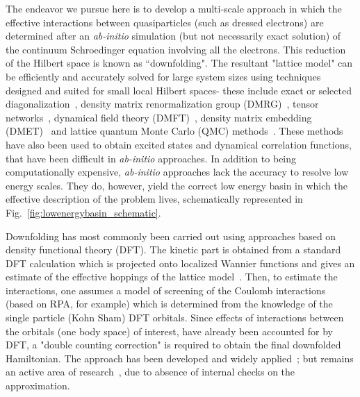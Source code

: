 The endeavor we pursue here is to develop a multi-scale approach in which the effective interactions between 
quasiparticles (such as dressed electrons) are determined after an \textit{ab-initio} simulation (but not necessarily exact 
solution) of the continuum Schroedinger equation involving all the electrons. This reduction 
of the Hilbert space is known as ``downfolding". The resultant "lattice model" can be efficiently and accurately 
solved for large system sizes using techniques designed and suited for small local Hilbert spaces- these include 
exact or selected diagonalization~\cite{DeRaedt,Tubman_selci,Holmes_Tubman_Umrigar}, density matrix renormalization group 
(DMRG)~\cite{White1992}, tensor networks~\cite{PEPS,Changlani_CPS,NeuscammanCPS}, 
dynamical field theory (DMFT)~\cite{}, density matrix embedding (DMET)~\cite{DMET_2012} and 
lattice quantum Monte Carlo (QMC) methods~\cite{Scalapino, Trivedi_Ceperley, Zhang_AFQMC, Sandvik_loops, Prokofiev, 
Booth2009,SQMC,Holmes_Changlani_Umrigar, Booth2013}. These methods have also been used to obtain 
excited states and dynamical correlation functions, that have been difficult in \textit{ab-initio} approaches. 
In addition to being computationally expensive, \textit{ab-initio} approaches lack the accuracy to resolve 
low energy scales. They do, however, yield the correct low energy basin in which the effective description of the problem lives, 
schematically represented in Fig.~\ref{fig:lowenergybasin_schematic}.

Downfolding has most commonly been carried out using approaches based on density functional theory (DFT). 
The kinetic part is obtained from a standard 
DFT calculation which is projected onto localized Wannier functions and 
gives an estimate of the effective hoppings of the lattice model~\cite{Pavirini}. 
Then, to estimate the interactions, one assumes a model of screening of the Coulomb interactions 
(based on RPA, for example) which is determined from the knowledge of the single particle (Kohn Sham) 
DFT orbitals. Since effects of interactions between the orbitals (one body space) of interest, have already 
been accounted for by DFT, a "double counting correction" is required to obtain the final 
downfolded Hamiltonian. The approach has been developed and widely applied~\cite{}; 
but remains an active area of research~\cite{Haule_doublecounting}, due to 
absence of internal checks on the approximation. 


